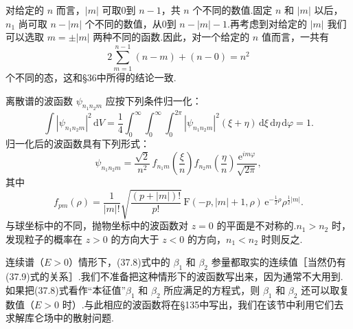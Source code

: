 对给定的 $n$ 而言，$|m|$ 可取0到 $n-1$，共 $n$ 个不同的数值.固定 $n$ 和 $|m|$ 以后，$n_1$ 尚可取 $n-|m|$ 个不同的数值，从0到 $n-|m|-1$.再考虑到对给定的 $|m|$ 我们可以选取 $m=\pm|m|$ 两种不同的函数.因此，对一个给定的 $n$ 值而言，一共有
\begin{equation*}
  2\sum_{m=1}^{n-1}(n-m)+(n-0)=n^2
\end{equation*}
个不同的态，这和§36中所得的结论一致.

离散谱的波函数 $\psi_{n_1n_2m}$ 应按下列条件归一化：
\begin{equation}
  \int|\psi_{n_1n_2m}|^2\,\mathrm{d}V
  =\frac{1}{4}\int_0^{\infty}\int_0^{\infty}\int_0^{2\pi}
  |\psi_{n_1n_2m}|^2(\xi+\eta)\,\mathrm{d}\xi\,\mathrm{d}\eta\,\mathrm{d}\varphi=1.
\end{equation}
归一化后的波函数具有下列形式：
\begin{equation}
  \psi_{n_1n_2m}=\frac{\sqrt{2}}{n^2}\,
  f_{n_1m}\left(\frac{\xi}{n}\right)f_{n_2m}\left(\frac{\eta}{n}\right)
  \frac{\mathrm{e}^{im\varphi}}{\sqrt{2\pi}},
\end{equation}
其中
\begin{equation}
  f_{pm}(\rho)=\frac{1}{|m|!}\sqrt{\frac{(p+|m|)!}{p!}}\,
  \mathrm{F}(-p,|m|+1,\rho)\,\mathrm{e}^{-\frac{1}{2}\rho}\rho^{\frac{1}{2}|m|}.
\end{equation}
与球坐标中的不同，抛物坐标中的波函数对 $z=0$ 的平面是不对称的.$n_1>n_2$ 时，发现粒子的概率在 $z>0$ 的方向大于 $z<0$ 的方向，$n_1<n_2$ 时则反之.

连续谱（$E>0$）情形下，(37.8)式中的 $\beta_1$ 和 $\beta_2$ 参量都取实的连续值［当然仍有(37.9)式的关系］.我们不准备把这种情形下的波函数写出来，因为通常不大用到.如果把(37.8)式看作“本征值”$\beta_1$ 和 $\beta_2$ 所应满足的方程式，则 $\beta_1$ 和 $\beta_2$ 还可以取复数值（$E>0$ 时）.与此相应的波函数将在§135中写出，我们在该节中利用它们去求解库仑场中的散射问题.

